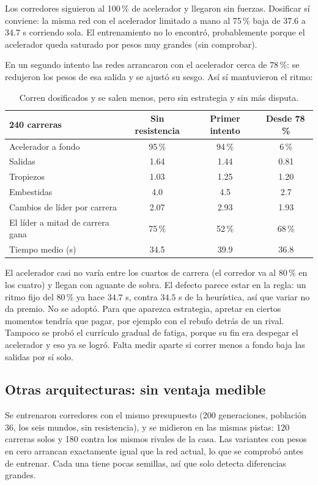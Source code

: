 \documentclass[11pt,letterpaper]{article}
\begin{document}
Los corredores siguieron al 100\,\% de acelerador y llegaron sin fuerzas. Dosificar sí conviene: la misma red con el acelerador limitado a mano al 75\,\% baja de $37.6$ a $34.7$ s corriendo sola. El entrenamiento no lo encontró, probablemente porque el acelerador queda saturado por pesos muy grandes (sin comprobar).

En un segundo intento las redes arrancaron con el acelerador cerca de $78$\,\%: se redujeron los pesos de esa salida y se ajustó su sesgo. Así sí mantuvieron el ritmo:

\begin{table}[h]\centering
\begin{tabular}{lccc}
\toprule
240 carreras & Sin resistencia & Primer intento & Desde 78\,\% \\
\midrule
Acelerador a fondo & 95\,\% & 94\,\% & 6\,\% \\
Salidas & 1.64 & 1.44 & 0.81 \\
Tropiezos & 1.03 & 1.25 & 1.20 \\
Embestidas & 4.0 & 4.5 & 2.7 \\
Cambios de líder por carrera & 2.07 & 2.93 & 1.93 \\
El líder a mitad de carrera gana & 75\,\% & 52\,\% & 68\,\% \\
Tiempo medio (s) & 34.5 & 39.9 & 36.8 \\
\bottomrule
\end{tabular}
\caption{Corren dosificados y se salen menos, pero sin estrategia y sin más disputa.}
\end{table}

El acelerador casi no varía entre los cuartos de carrera (el corredor va al $80$\,\% en los cuatro) y llegan con aguante de sobra. El defecto parece estar en la regla: un ritmo fijo del $80$\,\% ya hace $34.7$ s, contra $34.5$ s de la heurística, así que variar no da premio. No se adoptó. Para que aparezca estrategia, apretar en ciertos momentos tendría que pagar, por ejemplo con el rebufo detrás de un rival. Tampoco se probó el currículo gradual de fatiga, porque su fin era despegar el acelerador y eso ya se logró. Falta medir aparte si correr menos a fondo baja las salidas por sí solo.

\subsection{Otras arquitecturas: sin ventaja medible}
Se entrenaron corredores con el mismo presupuesto (200 generaciones, población 36, los seis mundos, sin resistencia), y se midieron en las mismas pistas: 120 carreras solos y 180 contra los mismos rivales de la casa. Las variantes con pesos en cero arrancan exactamente igual que la red actual, lo que se comprobó antes de entrenar. Cada una tiene pocas semillas, así que solo detecta diferencias grandes.
\end{document}

